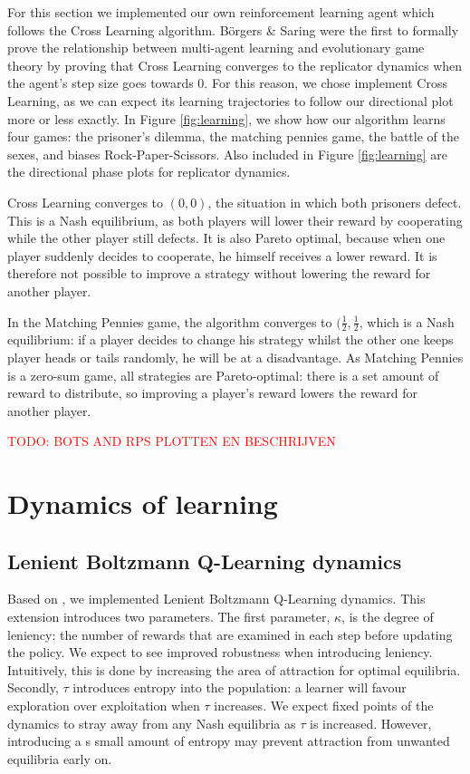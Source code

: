 \documentclass[10pt,a4paper]{article}
\begin{document}
For this section we implemented our own reinforcement learning agent which follows the Cross Learning algorithm. B\"{o}rgers \& Saring were the first to formally prove the relationship between multi-agent learning and evolutionary game theory by proving that Cross Learning converges to the replicator dynamics when the agent's step size goes towards 0. For this reason, we chose implement Cross Learning, as we can expect its learning trajectories to follow our directional plot more or less exactly. In Figure \ref{fig:learning}, we show how our algorithm learns four games: the prisoner's dilemma, the matching pennies game, the battle of the sexes, and biases Rock-Paper-Scissors. Also included in Figure \ref{fig:learning} are the directional phase plots for replicator dynamics.


Cross Learning converges to $(0,0)$, the situation in which both prisoners defect. This is a Nash equilibrium, as both players will lower their reward by cooperating while the other player still defects. It is also Pareto optimal, because when one player suddenly decides to cooperate, he himself receives a lower reward. It is therefore not possible to improve a strategy without lowering the reward for another player.

In the Matching Pennies game, the algorithm converges to $(\frac{1}{2},\frac{1}{2}$, which is a Nash equilibrium: if a player decides to change his strategy whilst the other one keeps player heads or tails randomly, he will be at a disadvantage. As Matching Pennies is a zero-sum game, all strategies are Pareto-optimal: there is a set amount of reward to distribute, so improving a player's reward lowers the reward for another player.

\textcolor{red}{TODO: BOTS AND RPS PLOTTEN EN BESCHRIJVEN}

\section{Dynamics of learning}

\subsection{Lenient Boltzmann Q-Learning dynamics}
Based on \citet{evoldynamics}, we implemented Lenient Boltzmann Q-Learning dynamics. This extension introduces two parameters. The first parameter, $\kappa$, is the degree of leniency: the number of rewards that are examined in each step before updating the policy. We expect to see improved robustness when introducing leniency. Intuitively, this is done by increasing the area of attraction for optimal equilibria. Secondly, $\tau$ introduces entropy into the population: a learner will favour exploration over exploitation when $\tau$ increases. We expect fixed points of the dynamics to stray away from any Nash equilibria as $\tau$ is increased. However, introducing a s small amount of entropy may prevent attraction from unwanted equilibria early on.
\end{document}
